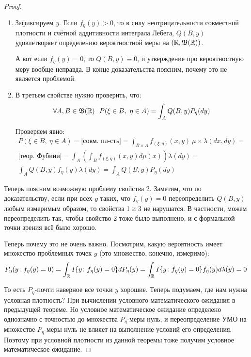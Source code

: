 \begin{proof}
\begin{enumerate}
        \item Зафиксируем $y$. Если $f_\eta(y) > 0$, то в силу неотрицательности совместной плотности и счётной аддитивности интеграла Лебега, $Q(B, y)$ удовлетворяет определению вероятностной меры на $(\mathbb{R}, \mathfrak{B}(\mathbb{R}))$.

        А вот если $f_\eta(y) = 0$, то $Q(B, y) \equiv 0$, и утверждение про вероятностную меру вообще неправда. В конце доказательства поясним, почему это не является проблемой.
        
        \item В третьем свойстве нужно проверить, что:
        \[
            \forall A, B \in \mathfrak{B}(\mathbb{R}) \ \ P(\xi \in B,\ \eta \in A) = \int_A Q(B, y) P_\eta(dy)
        \]

        Проверяем явно:
        \begin{multline*}
            P(\xi \in B,\ \eta \in A) = \text{[совм. пл-сть]} = \int_{B \times A} f_{(\xi, \eta)}(x, y) \ \mu \times \lambda (dx, dy) =
            \\
            \text{[теор. Фубини]} = \int_A \left( \int_B f_{(\xi, \eta)}(x, y) d\mu(x) \right) \lambda(dy) =
            \\
            \int_A Q(B, y) f_\eta(y) \lambda(dy) = \int_A Q(B, y) P_\eta(dy)
        \end{multline*}
    \end{enumerate}

    Теперь поясним возможную проблему свойства 2. Заметим, что по доказательству, если при всех $y$ таких, что $f_\eta(y) = 0$ переопределить $Q(B, y)$ любым измеримым образом, то свойства 1 и 3 не нарушатся. В частности, можем переопределить так, чтобы свойство 2 тоже было выполнено, и с формальной точки зрения всё было хорошо.

    Теперь почему это не очень важно. Посмотрим, какую вероятность имеет множество проблемных точек $y$ (это множество, конечно, измеримо):
    \[
        P_\eta(y \colon f_\eta(y) = 0) = \int_{\mathbb{R}} I\{y \colon f_\eta(y) = 0\} dP_\eta(y) = \int_{\mathbb{R}} I\{y \colon f_\eta(y) = 0\} f_\eta(y) d\lambda(y) = 0
    \]

    То есть $P_\eta$-почти наверное все точки $y$ хорошие. Теперь подумаем, где нам нужна условная плотность? При вычислении условного математического ожидания в предыдущей теореме. Но условное математическое ожидание определено однозначно с точностью до множества $P_\eta$-меры нуль, и переопределение УМО на множестве $P_\eta$-меры нуль не влияет на выполнение условий его определения. Поэтому при условной плотности из данной теоремы тоже получим условное математическое ожидание.
\end{proof}